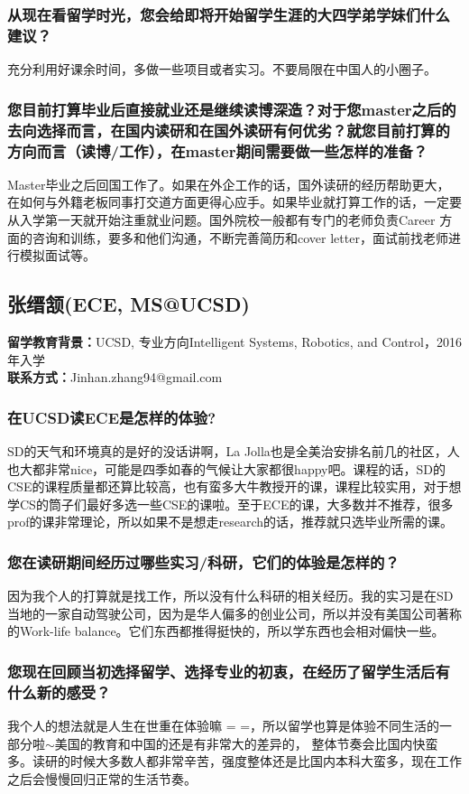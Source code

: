 \documentclass[a4paper,UTF8]{book}
\begin{document}
    \subsubsection*{从现在看留学时光，您会给即将开始留学生涯的大四学弟学妹们什么建议？}
    充分利用好课余时间，多做一些项目或者实习。不要局限在中国人的小圈子。
    \subsubsection*{您目前打算毕业后直接就业还是继续读博深造？对于您master之后的去向选择而言，在国内读研和在国外读研有何优劣？就您目前打算的方向而言（读博/工作），在master期间需要做一些怎样的准备？}
    Master毕业之后回国工作了。如果在外企工作的话，国外读研的经历帮助更大，在如何与外籍老板同事打交道方面更得心应手。如果毕业就打算工作的话，一定要从入学第一天就开始注重就业问题。国外院校一般都有专门的老师负责Career 方面的咨询和训练，要多和他们沟通，不断完善简历和cover letter，面试前找老师进行模拟面试等。


\clearpage
\subsection{张缙颔(ECE, MS@UCSD)}
    \textbf{留学教育背景：}UCSD, 专业方向Intelligent Systems, Robotics, and Control，2016年入学\\
    \textbf{联系方式：}Jinhan.zhang94@gmail.com

    \subsubsection*{在UCSD读ECE是怎样的体验?}
    SD的天气和环境真的是好的没话讲啊，La Jolla也是全美治安排名前几的社区，人也大都非常nice，可能是四季如春的气候让大家都很happy吧。课程的话，SD的CSE的课程质量都还算比较高，也有蛮多大牛教授开的课，课程比较实用，对于想学CS的筒子们最好多选一些CSE的课啦。至于ECE的课，大多数并不推荐，很多prof的课非常理论，所以如果不是想走research的话，推荐就只选毕业所需的课。
    
    \subsubsection*{您在读研期间经历过哪些实习/科研，它们的体验是怎样的？}
    因为我个人的打算就是找工作，所以没有什么科研的相关经历。我的实习是在SD当地的一家自动驾驶公司，因为是华人偏多的创业公司，所以并没有美国公司著称的Work-life balance。它们东西都推得挺快的，所以学东西也会相对偏快一些。
    
    \subsubsection*{您现在回顾当初选择留学、选择专业的初衷，在经历了留学生活后有什么新的感受？}
    我个人的想法就是人生在世重在体验嘛 = =，所以留学也算是体验不同生活的一部分啦$\sim$美国的教育和中国的还是有非常大的差异的， 整体节奏会比国内快蛮多。读研的时候大多数人都非常辛苦，强度整体还是比国内本科大蛮多，现在工作之后会慢慢回归正常的生活节奏。
\end{document}

